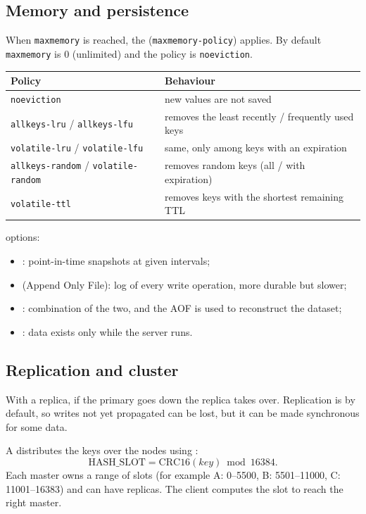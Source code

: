 \subsection{Memory and persistence}
When \texttt{maxmemory} is reached, the  (\texttt{maxmemory-policy}) applies. By default \texttt{maxmemory} is 0 (unlimited) and the policy is \texttt{noeviction}.

\begin{center}\small
\begin{tabular}{ll}
\toprule
\textbf{Policy} & \textbf{Behaviour} \\
\midrule
\texttt{noeviction} & new values are not saved \\
\texttt{allkeys-lru} / \texttt{allkeys-lfu} & removes the least recently / frequently used keys \\
\texttt{volatile-lru} / \texttt{volatile-lfu} & same, only among keys with an expiration \\
\texttt{allkeys-random} / \texttt{volatile-random} & removes random keys (all / with expiration) \\
\texttt{volatile-ttl} & removes keys with the shortest remaining TTL \\
\bottomrule
\end{tabular}
\end{center}

 options:
\begin{itemize}
  \item {}: point-in-time snapshots at given intervals;
  \item {} (Append Only File): log of every write operation, more durable but slower;
  \item {}: combination of the two, and the AOF is used to reconstruct the dataset;
  \item {}: data exists only while the server runs.
\end{itemize}

\subsection{Replication and cluster}
With a replica, if the primary goes down the replica takes over. Replication is  by default, so writes not yet propagated can be lost, but it can be made synchronous for some data.

A  distributes the keys over the nodes using :
\[
\mathrm{HASH\_SLOT} = \mathrm{CRC16}(key) \bmod 16384.
\]
Each master owns a range of slots (for example A: 0--5500, B: 5501--11000, C: 11001--16383) and can have replicas. The client computes the slot to reach the right master.

